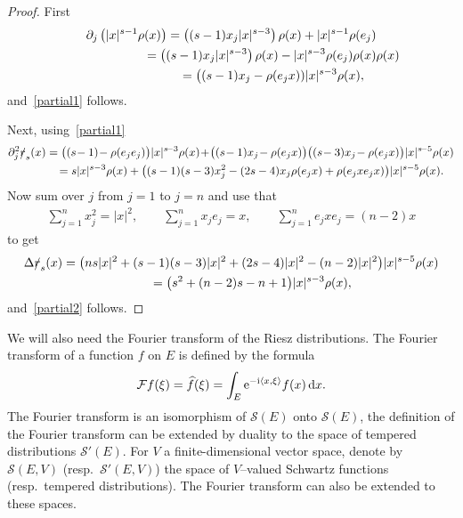 \documentclass[pdftex]{sigma}
\newcommand{\fsl}[1]{{\slashed{#1}}} %
\numberwithin{equation}{section}
\begin{document}
\begin{proof} First
\begin{gather*}
\partial_j \left(\vert x\vert^{s-1} \rho(x)\right) = \left((s-1) x_j \vert x\vert^{s-3}\right)\rho(x)+ \vert x\vert^{s-1} \rho(e_j)
\\ \hphantom{\partial_j \left(\vert x\vert^{s-1} \rho(x)\right) }
{}= \left((s-1) x_j \vert x\vert^{s-3}\right)\rho(x) - \vert x\vert^{s-3} \rho(e_j)\rho(x) \rho(x)
\\ \hphantom{\partial_j \left(\vert x\vert^{s-1} \rho(x)\right) }
{}= \big((s-1)x_j-\rho(e_jx)) \vert x\vert^{s-3}\rho(x) ,
\end{gather*}
and~\eqref{partial1} follows.

Next, using~\eqref{partial1}
\begin{gather*}
\partial_j^2\fsl{r}_s(x) = \big((s\!-1)\!-\rho(e_je_j)\big) \vert x\vert^{s\!-3}\rho(x)
\!+\!\big((s\!-1)x_j\!-\rho(e_jx)\big) \big((s\!-3) x_j\!-\rho(e_jx)\big) \vert x\vert^{s\!-5} \rho(x)
\\ \hphantom{\partial_j^2\fsl{r}_s(x)}
{}= s\vert x \vert^{s-3} \rho(x) + \big( (s-1)(s-3) x_j^2 -(2s-4)x_j\rho(e_jx)+\rho(e_jxe_jx)\big)\vert x\vert^{s-5}\rho(x) .
\end{gather*}
Now sum over $j$ from $j=1$ to $j=n$ and use that
\begin{gather*}
\sum_{j=1}^n x_j^2 = \vert x\vert^2, \qquad
\sum_{j=1}^n x_je_j = x,\qquad
\sum_{j=1}^n e_jxe_j = (n-2) x
\end{gather*}
to get
\begin{gather*}
\Delta \fsl{r}_s(x) = \big(ns\vert x \vert^2+(s-1)(s-3) \vert x\vert^2+(2s-4)\vert x\vert^2-(n-2) \vert x\vert^2\big)\vert x \vert^{s-5}\rho(x)
\\ \hphantom{\Delta \fsl{r}_s(x)}
{}=\big(s^2+(n-2)s-n+1\big) \vert x\vert^{s-3}\rho(x) ,
\end{gather*}
and~\eqref{partial2} follows.
\end{proof}

We will also need the Fourier transform of the Riesz distributions. The Fourier transform of a function $f$ on $E$ is defined by the formula
\begin{gather*}
\mathcal Ff(\xi) = \widehat f(\xi) = \int_E {\rm e}^{-{\rm i}\langle x,\xi\rangle} f(x)\,{\rm d}x.
\end{gather*}
The Fourier transform is an isomorphism of $\mathcal S(E)$ onto $\mathcal S(E)$, the definition of the Fourier transform can be extended by duality to the space of tempered distributions $\mathcal S'(E)$. For $V$ a
 finite-dimensional vector space, denote by $\mathcal S(E,V)$ (resp.~$\mathcal S'(E, V)$) the space of
 $V$--valued Schwartz functions (resp.~tempered distributions). The Fourier transform can also be extended to these spaces.
\end{document}
